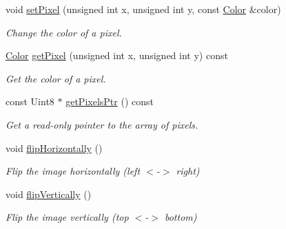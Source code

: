 \begin{DoxyCompactItemize}
void \mbox{\hyperlink{classsf_1_1_image_a9fd329b8cd7d4439e07fb5d3bb2d9744}{set\+Pixel}} (unsigned int x, unsigned int y, const \mbox{\hyperlink{classsf_1_1_color}{Color}} \&color)
\begin{DoxyCompactList}\small\item\em Change the color of a pixel. \end{DoxyCompactList}\item 
\mbox{\hyperlink{classsf_1_1_color}{Color}} \mbox{\hyperlink{classsf_1_1_image_acf278760458433b2c3626a6980388a95}{get\+Pixel}} (unsigned int x, unsigned int y) const
\begin{DoxyCompactList}\small\item\em Get the color of a pixel. \end{DoxyCompactList}\item 
const Uint8 $\ast$ \mbox{\hyperlink{classsf_1_1_image_ad9562b126fc8d5efcf608166992865c7}{get\+Pixels\+Ptr}} () const
\begin{DoxyCompactList}\small\item\em Get a read-\/only pointer to the array of pixels. \end{DoxyCompactList}\item 
void \mbox{\hyperlink{classsf_1_1_image_a57168e7bc29190e08bbd6c9c19f4bb2c}{flip\+Horizontally}} ()
\begin{DoxyCompactList}\small\item\em Flip the image horizontally (left $<$-\/$>$ right) \end{DoxyCompactList}\item 
void \mbox{\hyperlink{classsf_1_1_image_a78a702a7e49d1de2dec9894da99d279c}{flip\+Vertically}} ()
\begin{DoxyCompactList}\small\item\em Flip the image vertically (top $<$-\/$>$ bottom) \end{DoxyCompactList}\end{DoxyCompactItemize}
